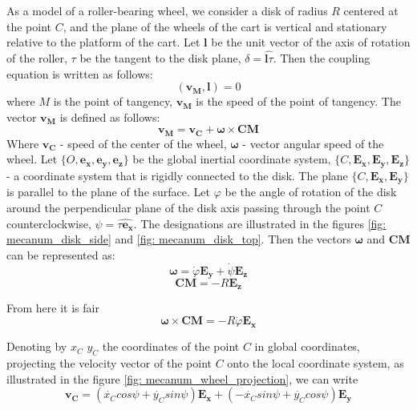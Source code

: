 \documentclass[oneside,final,14pt]{extreport}
\newcommand{\bs}{\boldsymbol}
\begin{document}
\begin{figure} [H]
\end{figure}

 As a model of a roller-bearing wheel, we consider a disk of radius $ R $ centered at the point $ C $, and the plane of the wheels of the cart is vertical and stationary relative to the platform of the cart. Let $ \bs{l} $ be the unit vector of the axis of rotation of the roller, $ \tau $ be the tangent to the disk plane, $ \delta = \widehat{\bs{l} \tau} $. Then the coupling equation is written as follows:
\begin{equation}
(
\bs{v_{M}}
,
\bs{l}
)
=
0
\end{equation}
where $ M $ is the point of tangency, $ \bs{v_{M}} $ is the speed of the point of tangency. The vector $ \bs{v_{M}} $ is defined as follows:
\begin{equation}
\bs{v_{M}}
=
\bs{v_{C}}
+
\bs{\omega}
\times
\bs{CM}
\end{equation}
Where
$ \bs{v_{C}} $ -
speed of the center of the wheel, $ \bs{\omega} $ - vector angular speed of the wheel.
Let $ \{O, \bs{e_{x}}, \bs{e_{y}}, \bs{e_{z}} \} $ be the global inertial coordinate system, $ \{C, \bs{E_{x}}, \bs{E_{y}}, \bs{E_{z}} \} $ - a coordinate system that is rigidly connected to the disk. The plane $ \{C, \bs{E_{x}}, \bs{E_{y}} \} $ is parallel to the plane of the surface. Let $ \varphi $ be the angle of rotation of the disk around the perpendicular plane of the disk axis passing through the point $ C $ counterclockwise, $ \psi = \widehat{\tau \bs{e_{x}}} $. The designations are illustrated in the figures \ref{fig: mecanum_disk_side} and \ref{fig: mecanum_disk_top}. Then the vectors $ \bs{\omega} $ and $ \bs{CM} $ can be represented as:
\begin{equation}
\bs{\omega}
=
\dot{\varphi}
\bs{E_{y}}
+
\dot{\psi}
\bs{E_{z}}
\end{equation}
\begin{equation}
\bs{CM}
=
-R
\bs{E_{z}}
\end{equation}

From here it is fair
\begin{equation}
\bs{\omega}
\times
\bs{CM}
=
-R \dot{\varphi}
\bs{E_{x}}
\end{equation}

Denoting by $ x_{C} $ $ y_{C} $ the coordinates of the point $ C $ in global coordinates, projecting the velocity vector of the point $ C $ onto the local coordinate system, as illustrated in the figure \ref{fig: mecanum_wheel_projection}, we can write
\begin{equation}
\label{eq: velocity_c_projection}
\bs{v_{C}}
=
(
\dot{x_{C}}
cos \psi
+
\dot{y_{C}}
sin \psi
)
\bs{E_{x}}
+
(
- \dot{x_{C}}
sin \psi
+
\dot{y_{C}}
cos \psi
)
\bs{E_{y}}
\end{equation}
\end{document}
